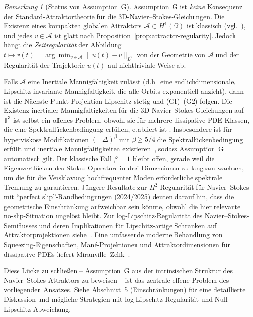 \documentclass[12pt,a4paper]{article}
\theoremstyle{definition}
\theoremstyle{plain}
\theoremstyle{remark}
\newtheorem{remark}[definition]{Bemerkung}
\begin{document}
\begin{remark}[Status von Assumption~G]\label{rem:assumption-G}
Assumption~G ist \emph{keine} Konsequenz der Standard-Attraktortheorie für die
3D-Navier--Stokes-Gleichungen. Die Existenz eines kompakten globalen Attraktors
$\mathcal{A} \subset H^1(\Omega)$ ist klassisch (vgl.\
\cite{FoiasManleyRosaTemam2001,Temam2001}), und jedes $v \in \mathcal{A}$ ist glatt
nach Proposition~\ref{prop:attractor-regularity}. Jedoch hängt die \emph{Zeitregularität}
der Abbildung $t \mapsto v(t) = \arg\min_{v \in \mathcal{A}} \|u(t) - v\|_{L^2}$
von der Geometrie von $\mathcal{A}$ und der Regularität der Trajektorie $u(t)$
auf nichttriviale Weise ab.

Falls $\mathcal{A}$ eine Inertiale Mannigfaltigkeit zulässt (d.h.\ eine endlichdimensionale,
Lipschitz-invariante Mannigfaltigkeit, die alle Orbits exponentiell anzieht), dann ist die
Nächste-Punkt-Projektion Lipschitz-stetig und (G1)--(G2) folgen.
Die Existenz inertialer Mannigfaltigkeiten für die 3D-Navier--Stokes-Gleichungen auf
$\mathbb{T}^3$ ist selbst ein offenes Problem, obwohl sie für mehrere
dissipative PDE-Klassen, die eine Spektrallückenbedingung erfüllen, etabliert ist
\cite{EdenFoiasNicolaenko1994}. Insbesondere ist für hyperviskose
Modifikationen $(-\Delta)^{\beta}$ mit $\beta \geq 5/4$ die Spektrallückenbedingung erfüllt und inertiale Mannigfaltigkeiten existieren~\cite{MalletParetSell1988},
sodass Assumption~G automatisch gilt. Der klassische Fall $\beta = 1$ bleibt
offen, gerade weil die Eigenwertlücken des Stokes-Operators in drei Dimensionen
zu langsam wachsen, um die für die Versklavung hochfrequenter Moden erforderliche
spektrale Trennung zu garantieren. Jüngere Resultate zur $H^2$-Regularität für Navier--Stokes
mit ``perfect slip''-Randbedingungen (2024/2025) deuten darauf hin, dass die
geometrische Einschränkung aufweichbar sein könnte, obwohl die hier relevante
no-slip-Situation ungelöst bleibt.
Zur log-Lipschitz-Regularität des Navier--Stokes-Semiflusses und deren
Implikationen für Lipschitz-artige Schranken auf Attraktorprojektionen
siehe~\cite{BaeCannone2016,MalletParetSell1988}.
Eine umfassende moderne Behandlung von Squeezing-Eigenschaften, Man\'e-Projektionen
und Attraktordimensionen für dissipative PDEs liefert
Miranville--Zelik~\cite{MiranvilleZelik2008}.

Diese Lücke zu schließen -- Assumption~G aus der intrinsischen Struktur des
Navier--Stokes-Attraktors zu beweisen -- ist das zentrale offene Problem des vorliegenden Ansatzes.
Siehe Abschnitt~5 (Einschränkungen) für eine detaillierte Diskussion und mögliche Strategien
mit log-Lipschitz-Regularität und Null-Lipschitz-Abweichung.


\end{remark}
\end{document}
